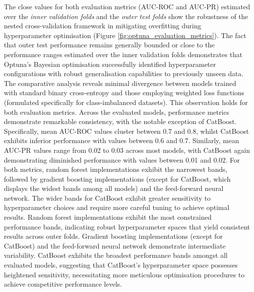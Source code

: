 The  close values for both evaluation metrics (AUC-ROC and AUC-PR) estimated over the \textcolor{colourInnerValidation}{\textit{inner validation folds}} and the \textcolor{colourOuterTest}{\textit{outer test folds}} show the robustness of the nested cross-validation framework in mitigating overfitting during hyperparameter optimisation  (Figure \ref{fig:optuna_evaluation_metrics}). The fact that outer test performance remains generally bounded or close to the performance ranges estimated over the inner validation folds demonstrates that Optuna's Bayesian optimisation successfully identified hyperparameter configurations with robust generalisation capabilities to previously unseen data. The comparative analysis reveals minimal divergence between models trained with standard binary cross-entropy and those employing weighted loss functions (formulated specifically for class-imbalanced datasets). This observation holds for both evaluation metrics. Across the evaluated models, performance metrics demonstrate remarkable consistency, with the notable exception of CatBoost. Specifically, mean AUC-ROC values cluster between 0.7 and 0.8, whilst CatBoost exhibits inferior performance with values between 0.6 and 0.7. Similarly, mean AUC-PR values range from 0.02 to 0.03 across most models, with CatBoost again demonstrating diminished performance with values between 0.01 and 0.02. For both metrics, random forest implementations exhibit the narrowest bands, followed by gradient boosting implementations (except for CatBoost, which displays the widest bands among all models) and the feed-forward neural network. The wider bands for CatBoost exhibit greater sensitivity to hyperparameter choices and require more careful tuning to achieve optimal results. Random forest implementations exhibit the most constrained performance bands, indicating robust hyperparameter spaces that yield consistent results across outer folds. Gradient boosting implementations (except for CatBoost) and the feed-forward neural network demonstrate intermediate variability. CatBoost exhibits the broadest performance bands amongst all evaluated models, suggesting that CatBoost's hyperparameter space possesses heightened sensitivity, necessitating more meticulous optimisation procedures to achieve competitive performance levels.

